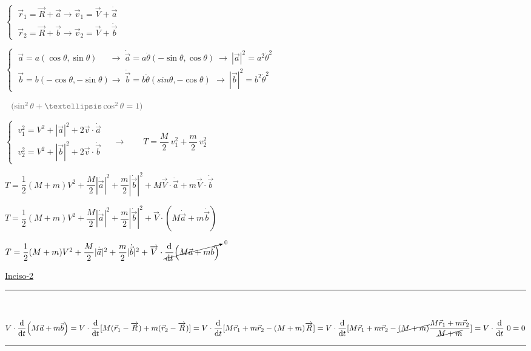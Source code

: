 $\begin{cases}
\ \vec r_1 = \overrightarrow R + \vec a  \to \vec v_1= \overrightarrow V + \dot{\vec a}
\\ \ \vec r_2=\overrightarrow R + \vec b	 \to \vec v_2=\overrightarrow V + \dot{\vec b}
\end{cases}  $

$\begin{cases} 
\ \vec a=a(\cos \theta, \sin \theta) \quad \ \ \to \ \dot{\vec a}=a\dot \theta (-\sin \theta,\cos \theta ) \ \to \ |\vec a|^2=a^2 \dot \theta^2 \\
\ \vec b=b(-\cos \theta, -\sin \theta)  \to \ \dot{\vec b}=b\dot \theta (sin \theta,-\cos \theta ) \ \, \to \ |\vec b|^2=b^2 \dot \theta^2 
\end{cases}$ \begin{footnotesize} $\ \  \textcolor{gris}{(\sin^2 \theta + …\cos^2 \theta=1)}$ \end{footnotesize}

$\begin{cases}
\ v_1^2=V^2+|\vec a|^2+2\vec v \cdot \dot{\vec a} \\	
\ v_2^2=V^2+|\vec b|^2+2\vec v \cdot \dot{\vec b}
\end{cases} \quad \to \qquad T=\dfrac M 2 \ v_1^2 + \dfrac m 2 \ v_2^2$ 

$T=\dfrac 1 2 {(M+m)} V^2 + \dfrac M 2 |\dot{\vec a}|^2 + \dfrac m 2 |\dot{ \vec b}|^2 + M \overrightarrow V \cdot \dot{\vec a}+ m \overrightarrow V \cdot \dot{\vec b} $

$T=\dfrac 1 2 {(M+m)} V^2 + \dfrac M 2 |\dot{\vec a}|^2 + \dfrac m 2 |\dot {\vec b}|^2 +\overrightarrow V \cdot (M\dot{\vec a} + m\dot{\vec b})$

$T=\dfrac 1 2 {(M+m)} V^2 + \dfrac M 2 |\dot{\vec a}|^2 + \dfrac m 2 |\dot {\vec b}|^2 +
\overrightarrow V \cdot \cancelto{0}{ \displaystyle \dv{t} (M \vec a + m \vec b)}$

\vspace{7mm} 
\ul{Inciso-2} $\quad$ \rule{150pt}{0.1pt} $\quad$ 

$V \cdot  \displaystyle \dv{t} (M \vec a + m \vec b) = 
V \cdot  \displaystyle \dv{t} [M (\vec r_1-\overrightarrow R) + m (\vec r_2-\overrightarrow R)]=
V \cdot  \displaystyle \dv{t} [M\vec r_1+m\vec r_2 - (M+m) \overrightarrow R ]=
V \cdot  \displaystyle \dv{t} [M\vec r_1+m\vec r_2 - \cancel{(M+m)} \dfrac{M\vec r_1 + m \vec r_2}{ \cancel{M+m}}]=
V \cdot \displaystyle \dv{t} \ 0 =0$

\begin{flushright} \rule{300pt}{0.1pt}	\end{flushright}

